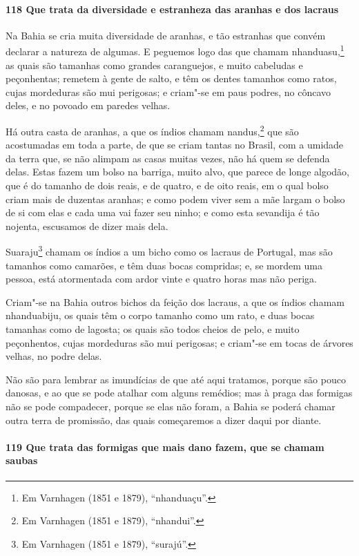 \paragraph{118 Que trata da diversidade e estranheza das aranhas e dos lacraus}

Na Bahia se cria muita diversidade de aranhas, e tão estranhas que convém declarar a
natureza de algumas. E peguemos logo das que chamam nhanduasu,\footnote{ Em Varnhagen (1851
e 1879), ``nhanduaçu''.} as quais são tamanhas como grandes caranguejos, e muito
cabeludas e peçonhentas; remetem à gente de salto, e têm os dentes tamanhos como ratos,
cujas mordeduras são mui perigosas; e criam"-se em paus podres, no côncavo deles, e no
povoado em paredes velhas.

Há outra casta de aranhas, a que os índios chamam nandus,\footnote{ Em Varnhagen (1851 e
1879), ``nhandui''.} que são acostumadas em toda a parte, de que se criam tantas no
Brasil, com a umidade da terra que, se não alimpam as casas muitas vezes, não há quem se
defenda delas. Estas fazem um bolso na barriga, muito alvo, que parece de longe algodão,
que é do tamanho de dois reais, e de quatro, e de oito reais, em o qual bolso criam mais
de duzentas aranhas; e como podem viver sem a mãe largam o bolso de si com elas e cada uma
vai fazer seu ninho; e como esta sevandija é tão nojenta, escusamos de dizer mais dela.

Suaraju\footnote{ Em Varnhagen (1851 e 1879), ``surajú''.} chamam os índios a um bicho
como os lacraus de Portugal, mas são tamanhos como camarões, e têm duas bocas compridas;
e, se mordem uma pessoa, está atormentada com ardor vinte e quatro horas mas não periga.

Criam"-se na Bahia outros bichos da feição dos lacraus, a que os índios chamam nhanduabiju,
os quais têm o corpo tamanho como um rato, e duas bocas tamanhas como de lagosta; os quais
são todos cheios de pelo, e muito peçonhentos, cujas mordeduras são mui perigosas; e
criam"-se em tocas de árvores velhas, no podre delas.

Não são para lembrar as imundícias de que até aqui tratamos, porque são pouco danosas, e
ao que se pode atalhar com alguns remédios; mas à praga das formigas não se pode
compadecer, porque se elas não foram, a Bahia se poderá chamar outra terra de promissão,
das quais começaremos a dizer daqui por diante.

\paragraph{119 Que trata das formigas que mais dano fazem, que se chamam saubas}

